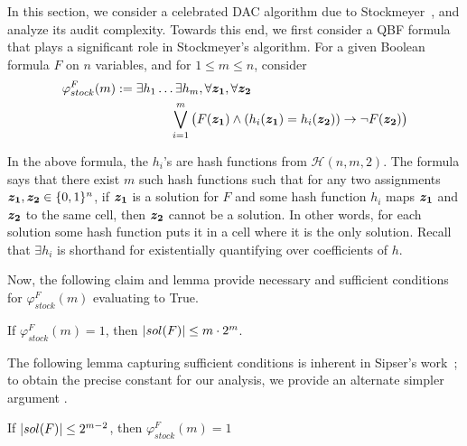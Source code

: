 In this section, we consider a celebrated DAC algorithm due to Stockmeyer~\cite{stockmeyer}, and analyze its audit complexity. Towards this end, we
first consider a QBF formula that plays a significant role in Stockmeyer's algorithm.   For a given Boolean formula $F$ on $n$ variables, and for $1 \le m \le n$, consider
  \begin{align*}
 	\varphi_{stock}^F(m):=  \exists h_1\ldots \exists h_m, \forall {\boldsymbol{\ensuremath{{\boldsymbol{z_1}}}}}, \forall {\boldsymbol{\ensuremath{{\boldsymbol{z_2}}}}}~~~~~~~~~~~~~~~~~~~~~~~~~~~~~~~~~~~~~\\ \bigvee_{i=1}^m \big( F({\boldsymbol{{\boldsymbol{z_1}}}})\land (h_i({\boldsymbol{{\boldsymbol{z_1}}}})=h_i({\boldsymbol{{\boldsymbol{z_2}}}}))\rightarrow \neg F({\boldsymbol{{\boldsymbol{z_2}}}})\big)
 \end{align*}
 
In the above formula, the $h_i$'s are hash functions from
$\mathcal{H}(n, m, 2)$.  The formula says that there exist $m$ such hash
functions such that for any two assignments
${\boldsymbol{z_1}}, {\boldsymbol{z_2}}\in \{0,1\}^n$, if ${\boldsymbol{z_1}}$ is a
solution for $F$ and some hash function $h_i$ maps ${\boldsymbol{z_1}}$ and
${\boldsymbol{z_2}}$ to the same cell, then ${\boldsymbol{z_2}}$ cannot be a
solution. In other words, for each solution some hash function puts it
in a cell where it is the only solution. {Recall that $\exists h_i$ is
shorthand for existentially quantifying over coefficients of $h$.}

Now, the following claim and lemma provide necessary and sufficient conditions for $\varphi_{stock}^F(m)$ evaluating to True. 


\begin{claim}[Necessary]
 	\label{cl:stockup}
 	If $\varphi^F_{stock}(m)=1$, then  $|sol({F})|\leq m\cdot 2^m$.

\end{claim}
 
 

The following lemma capturing sufficient conditions is inherent in Sipser's work~\cite{Sipser83}; to obtain the precise constant for our analysis, we provide an alternate simpler argument .
\begin{lemma}[Sufficient]
	\label{lm:stockexist}
If $|sol({F})|\leq 2^{m-2}$, then $\varphi_{stock}^F(m) =1$ 
\end{lemma}






